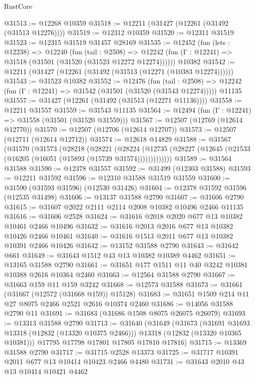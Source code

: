 \begin{lexlean}{RustCore}
\begin{coremodule}
@31513 := @12268 @10359
@31518 := @12211 (@31427 (@12261 (@31492 (@31513 @12276))))
@31519 := @12312 @10359
@31520 := @12311 @31519
@31523 := @12315 @31519 @31457 @28169
@31535 := @12452
    (fun (lets : @12238) =>
    @12240
      (fun (tail : @2508) =>
      @12242 (fun (Γ : @12241) => @31518 (@31501 (@31520 (@31523 @12272 @12274))))))
    @10382
@31542 := @12211 (@31427 (@12261 (@31492 (@31513 (@12271 (@10383 @12274))))))
@31543 := @31523 @10382
@31552 := @12476
    (fun (tail : @2508) => @12242 (fun (Γ : @12241) => @31542 (@31501 (@31520 (@31543 @12274)))))
    @11135
@31557 := @31427 (@12261 (@31492 (@31513 (@12271 @11136))))
@31558 := @12211 @31557
@31559 := @31543 @11135
@31564 := @12494 (fun (Γ : @12241) => @31558 (@31501 (@31520 @31559)))
@31567 := @12507 (@12769 (@12614 @12770))
@31570 := @12507 (@12706 (@12614 @12707))
@31573 := @12507 (@12711 (@12614 @12712))
@31574 := @12618 @14829
@31588 := @31567
    (@31570
      (@31573
        (@28218
          (@28221
            (@28224
              (@12735 (@28227 (@12645 (@21533 (@16205 (@16051 (@15893 (@15739 @31574)))))))))))))
@31589 := @31564 @31588
@31590 := @12378 @31557
@31592 := @31499 (@12303 @31588)
@31593 := @12211 @31592
@31596 := @12310 @31588 @31519 @31559
@31600 := @31590 (@31593 @31596) (@12530 @31426)
@31604 := @12378 @31592 @31596 (@12535 @31498)
@31606 := @13137 @31588 @2790
@31607 := @31606 @2790
@31615 := @31607 @2022 @2111 @2114 @2008 @10382 @10496 @2466 @11135
@31616 := @31606 @2528
@31624 := @31616 @2018 @2020 @677 @13 @10382 @10461 @2466 @10496
@31632 := @31616 @2013 @2016 @677 @13 @10382 @10426 @2466 @10461
@31640 := @31616 @1513 @2011 @677 @13 @10382 @10391 @2466 @10426
@31642 := @13152 @31588 @2790
@31643 := @31642 @661
@31649 := @31643 @1512 @43 @13 @10382 @10389 @4462
@31651 := @13165 @31588 @2790
@31661 := @31651 @177 @1511 @11 @40 @3242 @10381 @10388 @2616 @10364 @2460
@31663 := @12564 @31588 @2790
@31667 := @31663 @159 @11 @159 @3242
@31668 := @12573 @31588
@31673 := @31661 (@31667 (@12572 (@31668 @159)) @15128)
@31683 := @31651 @1509 @214 @11 @27 @8075 @2466 @2521 @2616 @10374 @2460
@31686 := @14056 @31588 @2790 @11
@31691 := @31683 (@31686 @1508 @8075 @26075 @26079)
@31693 := @13313 @31588 @2790
@31713 := @31640
    (@31649
      (@31673
        (@31691 @31693 @13318 (@12832 (@13320 @10375 @2466)))
        @13318
        (@12832 (@13320 @10365 @10381)))
      @17795
      @17798
      @17801
      @17805
      @17810
      @17816)
@31715 := @13369 @31588 @2790
@31717 := @31715 @2528 @13373
@31725 := @31717 @10391 @2011 @677 @13 @10414 @10423 @2466 @4480
@31731 := @31643 @2010 @43 @13 @10414 @10421 @4462

\end{coremodule}
\end{lexlean}
